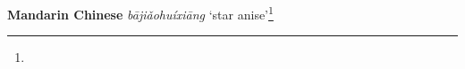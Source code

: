 \begin{etymology}\label{ety:bajiaohuixiang}
\textbf{Mandarin Chinese}  \textit{bājiǎohuíxiāng} `star anise'\footnote{}
\end{etymology}